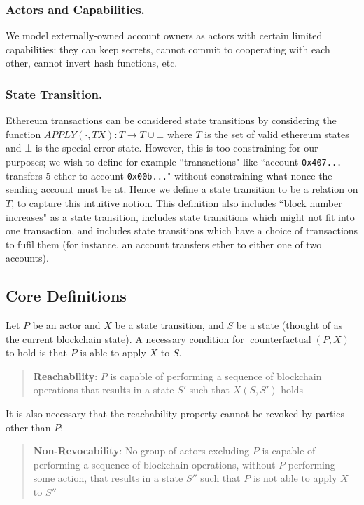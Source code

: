 \documentclass[prb,floatfix,reprint,nofootinbib,amsmath,amssymb,epsfig,pre,floats,letterpaper,groupedaffiliation,tightenlines,allcolors=blue,11pt]{revtex4}
\theoremstyle{definition}
\theoremstyle{definition}
\theoremstyle{definition}
\DeclareMathOperator{\counterfactual}{counterfactual}
\begin{document}
\begin{appendix}
\subsubsection{Actors and Capabilities.} We model externally-owned account owners as actors with certain limited capabilities: they can keep secrets, cannot commit to cooperating with each other, cannot invert hash functions, etc.

\subsubsection{State Transition.} Ethereum transactions can be considered state transitions by considering the function $APPLY(\cdot, TX) : T \to T \cup \bot$ where $T$ is the set of valid ethereum states and $\bot$ is the special error state. However, this is too constraining for our purposes; we wish to define for example ``transactions" like ``account \texttt{0x407...} transfers 5 ether to account \texttt{0x00b...}" without constraining what nonce the sending account must be at. Hence we define a state transition to be a relation on $T$, to capture this intuitive notion. This definition also includes ``block number increases" as a state transition, includes state transitions which might not fit into one transaction, and includes state transitions which have a choice of transactions to fufil them (for instance, an account transfers ether to either one of two accounts).

\subsection{Core Definitions}

Let $P$ be an actor and $X$ be a state transition, and $S$ be a state (thought of as the current blockchain state). A necessary condition for $\counterfactual(P, X)$ to hold is that $P$ is able to apply $X$ to $S$.

\begin{quote}
\textbf{Reachability}: $P$ is capable of performing a sequence of blockchain operations that results in a state $S'$ such that $X(S, S')$ holds
\end{quote}

It is also necessary that the reachability property cannot be revoked by parties other than $P$:

\begin{quote}
\textbf{Non-Revocability}: No group of actors excluding $P$ is capable of performing a sequence of blockchain operations, without $P$ performing some action, that results in a state $S''$ such that $P$ is not able to apply $X$ to $S''$
\end{quote}


\end{appendix}
\end{document}
